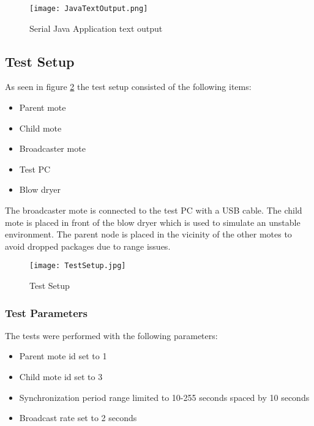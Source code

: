 \documentclass[Main]{subfiles}
\begin{document}
			\begin{figure}[H]
				\centering
				\texttt{[image: JavaTextOutput.png]}
				\caption{Serial Java Application text output}
				\label{fig:JavaTextOutput}
			\end{figure}

			


	\subsection{Test Setup} %
	\label{sub:test_setup}

		As seen in figure \ref{fig:TestSetup} the test setup consisted of the following items:

		\begin{itemize}
			\item Parent mote
			\item Child mote
			\item Broadcaster mote
			\item Test PC
			\item Blow dryer 
		\end{itemize}

		The broadcaster mote is connected to the test PC with a USB cable.
		The child mote is placed in front of the blow dryer which is used to simulate an unstable environment.
		The parent node is placed in the vicinity of the other motes to avoid dropped packages due to range issues.

		\begin{figure}[H]
			\centering
			\texttt{[image: TestSetup.jpg]}
			\caption{Test Setup}
			\label{fig:TestSetup}
		\end{figure}

		\subsubsection{Test Parameters} %
		\label{subsub:test_parameters}
			The tests were performed with the following parameters:

			\begin{itemize}
				\item Parent mote id set to 1
				\item Child mote id set to 3
				\item Synchronization period range limited to 10-255 seconds spaced by 10 seconds
				\item Broadcast rate set to 2 seconds
			\end{itemize}
\end{document}
